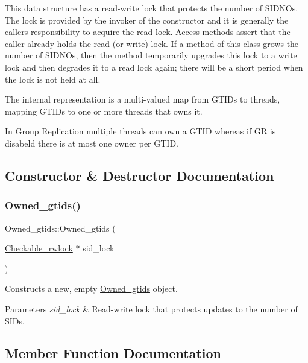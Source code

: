 This data structure has a read-\/write lock that protects the number of S\+I\+D\+N\+Os. The lock is provided by the invoker of the constructor and it is generally the caller\textquotesingle{}s responsibility to acquire the read lock. Access methods assert that the caller already holds the read (or write) lock. If a method of this class grows the number of S\+I\+D\+N\+Os, then the method temporarily upgrades this lock to a write lock and then degrades it to a read lock again; there will be a short period when the lock is not held at all.

The internal representation is a multi-\/valued map from G\+T\+I\+Ds to threads, mapping G\+T\+I\+Ds to one or more threads that owns it.

In Group Replication multiple threads can own a G\+T\+ID whereas if GR is disabeld there is at most one owner per G\+T\+ID. 

\subsection{Constructor \& Destructor Documentation}
\mbox{\label{classOwned__gtids_a7b91d015754445c004455b37096da3f1}} 
\subsubsection{\texorpdfstring{Owned\+\_\+gtids()}{Owned\_gtids()}}
{\footnotesize\ttfamily Owned\+\_\+gtids\+::\+Owned\+\_\+gtids (\begin{DoxyParamCaption}\item[{\mbox{\hyperlink{classCheckable__rwlock}{Checkable\+\_\+rwlock}} $\ast$}]{sid\+\_\+lock }\end{DoxyParamCaption})}

Constructs a new, empty \mbox{\hyperlink{classOwned__gtids}{Owned\+\_\+gtids}} object.


\begin{DoxyParams}{Parameters}
{\em sid\+\_\+lock} & Read-\/write lock that protects updates to the number of S\+I\+Ds. \\
\hline
\end{DoxyParams}


\subsection{Member Function Documentation}
\mbox{\label{classOwned__gtids_a323fa3724e5214e36bac9153e9cb3585}} 
